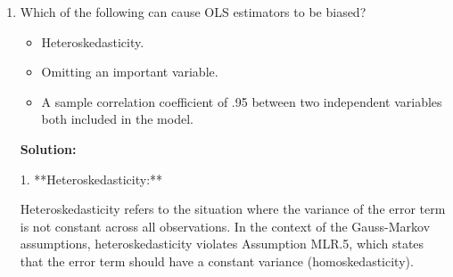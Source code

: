 \documentclass[12pt]{article}
\begin{document}
\begin{enumerate}
{\color{blue}
\noindent \textbf{Solution:}

The goal is to analyze the bias in \( \widetilde{\beta}_1 \) (the estimated coefficient for avgtrain) when only avgprod is regressed on avgtrain (ignoring avgabil). The bias in \( \widetilde{\beta}_1 \) depends on the relationship between avgtrain and avgabil.

Given that avgtrain and avgabil are negatively correlated, assume a linear relationship between them:
\[
\text{avgabil} = \delta_0 + \delta_1 \text{avgtrain} + v,
\]
where \( \delta_1 < 0 \) because the correlation is negative.

Substituting this relationship into the true model gives:
\[
\text{avgprod} = \beta_0 + \beta_1 \text{avgtrain} + \beta_2 (\delta_0 + \delta_1 \text{avgtrain} + v) + u.
\]

Expanding the equation:
\[
\text{avgprod} = (\beta_0 + \beta_2 \delta_0) + (\beta_1 + \beta_2 \delta_1) \text{avgtrain} + (\beta_2 v + u).
\]

If avgprod is regressed only on avgtrain, the coefficient \( \widetilde{\beta}_1 \) will be biased. The bias is:
\[
\text{Bias}(\widetilde{\beta}_1) = \beta_2 \delta_1.
\]

Since \( \delta_1 < 0 \) (due to the negative correlation), the sign of the bias depends on \( \beta_2 \). If \( \beta_2 > 0 \), the bias will be negative. If \( \beta_2 < 0 \), the bias will be positive.


}



\item Which of the following can cause OLS estimators to be biased?
\begin{itemize}
    \item Heteroskedasticity.
\item Omitting an important variable.
\item A sample correlation coefficient of .95 between two independent variables both included in the model.
\end{itemize}


{\color{blue}
\noindent \textbf{Solution:}

1. **Heteroskedasticity:**

Heteroskedasticity refers to the situation where the variance of the error term is not constant across all observations. In the context of the Gauss-Markov assumptions, heteroskedasticity violates Assumption MLR.5, which states that the error term should have a constant variance (homoskedasticity).

}
\end{enumerate}
\end{document}
